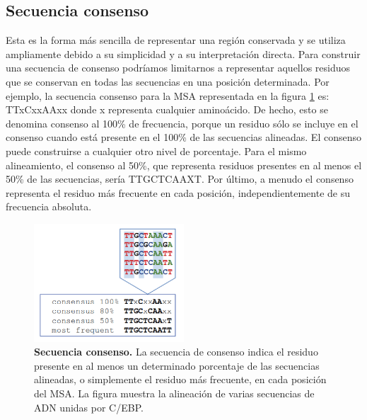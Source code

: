 \subsection{Secuencia consenso}
Esta es la forma más sencilla de representar una región conservada y se utiliza ampliamente debido a su simplicidad y a su interpretación directa. Para construir una secuencia de consenso podríamos limitarnos a representar aquellos residuos que se conservan en todas las secuencias en una posición determinada. Por ejemplo, la secuencia consenso para la MSA representada en la figura \ref{fig:consensus-seq} es: TTxCxxAAxx donde x representa cualquier aminoácido. De hecho, esto se denomina consenso al 100\% de frecuencia, porque un residuo sólo se incluye en el consenso cuando está presente en el 100\% de las secuencias alineadas. El consenso puede construirse a cualquier otro nivel de porcentaje. Para el mismo alineamiento, el consenso al 50\%, que representa residuos presentes en al menos el 50\% de las secuencias, sería TTGCTCAAXT. Por último, a menudo el consenso representa el residuo más frecuente en cada posición, independientemente de su frecuencia absoluta.

\begin{figure}[htbp]
\centering
\includegraphics[width = 0.5\textwidth]{figs/consensus-seq.png}
\caption{\textbf{Secuencia consenso.} La secuencia de consenso indica el residuo presente en al menos un determinado porcentaje de las secuencias alineadas, o simplemente el residuo más frecuente, en cada posición del MSA. La figura muestra la alineación de varias secuencias de ADN unidas por C/EBP.}
\label{fig:consensus-seq}
\end{figure}

